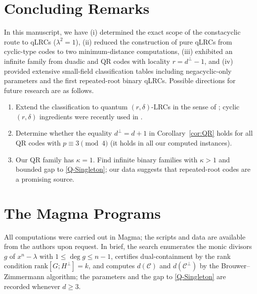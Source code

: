 \documentclass[journal,onecolumn]{IEEEtran}
\newcommand{\cc}{{\mathcal C}}
\begin{document}
\section{Concluding Remarks}\label{sec:con}

In this manuscript, we have (i) determined the exact scope of the constacyclic route to qLRCs ($\lambda^2=1$), (ii) reduced the construction of pure qLRCs from cyclic-type codes to two minimum-distance computations, (iii) exhibited an infinite family from duadic and QR codes with locality $r=d^\perp-1$, and (iv) provided extensive small-field classification tables including negacyclic-only parameters and the first repeated-root binary qLRCs. Possible directions for future research are as follows.
\begin{enumerate}
\item Extend the classification to quantum $(r,\delta)$-LRCs in the sense of \cite{Galindo2024}; cyclic $(r,\delta)$ ingredients were recently used in \cite{Rajpurohit2026}.
\item Determine whether the equality $d^\perp=d+1$ in Corollary~\ref{cor:QR} holds for all QR codes with $p\equiv3\pmod4$ (it holds in all our computed instances).
\item Our QR family has $\kappa=1$. Find infinite binary families with $\kappa>1$ and bounded gap to \eqref{Q-Singleton}; our data suggests that repeated-root codes are a promising source.
\end{enumerate}

\appendices
\section{The Magma Programs}\label{app:magma}

All computations were carried out in Magma; the scripts and data are available from the authors upon request. In brief, the search enumerates the monic divisors $g$ of $x^n-\lambda$ with $1\le\deg g\le n-1$, certifies dual-containment by the rank condition $\mathrm{rank}[G;H^\perp]=k$, and computes $d(\cc)$ and $d(\cc^\perp)$ by the Brouwer--Zimmermann algorithm; the parameters and the gap to \eqref{Q-Singleton} are recorded whenever $d\ge3$.



\end{document}

